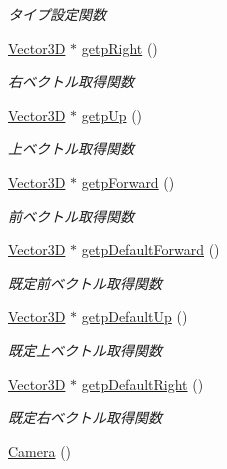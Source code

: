 \begin{DoxyCompactItemize}
\begin{DoxyCompactList}\small\item\em タイプ設定関数 \end{DoxyCompactList}\item 
\mbox{\hyperlink{class_vector3_d}{Vector3D}} $\ast$ \mbox{\hyperlink{class_camera_a4598846e26db6cf3fe4a661b8e6a1917}{getp\+Right}} ()
\begin{DoxyCompactList}\small\item\em 右ベクトル取得関数 \end{DoxyCompactList}\item 
\mbox{\hyperlink{class_vector3_d}{Vector3D}} $\ast$ \mbox{\hyperlink{class_camera_a519361bbdc75f342e7f7754dac1f4e49}{getp\+Up}} ()
\begin{DoxyCompactList}\small\item\em 上ベクトル取得関数 \end{DoxyCompactList}\item 
\mbox{\hyperlink{class_vector3_d}{Vector3D}} $\ast$ \mbox{\hyperlink{class_camera_acef9b42caead07f003dc3f98c0ccdc3c}{getp\+Forward}} ()
\begin{DoxyCompactList}\small\item\em 前ベクトル取得関数 \end{DoxyCompactList}\item 
\mbox{\hyperlink{class_vector3_d}{Vector3D}} $\ast$ \mbox{\hyperlink{class_camera_a6f4c660007278a3db020a72242c9cb26}{getp\+Default\+Forward}} ()
\begin{DoxyCompactList}\small\item\em 既定前ベクトル取得関数 \end{DoxyCompactList}\item 
\mbox{\hyperlink{class_vector3_d}{Vector3D}} $\ast$ \mbox{\hyperlink{class_camera_a1a807dd20a5e8a5d8e5116748a54dfa7}{getp\+Default\+Up}} ()
\begin{DoxyCompactList}\small\item\em 既定上ベクトル取得関数 \end{DoxyCompactList}\item 
\mbox{\hyperlink{class_vector3_d}{Vector3D}} $\ast$ \mbox{\hyperlink{class_camera_ad83e4c1317708ca7282556d3f6a9ad25}{getp\+Default\+Right}} ()
\begin{DoxyCompactList}\small\item\em 既定右ベクトル取得関数 \end{DoxyCompactList}\item 
\mbox{\hyperlink{class_camera_a01f94c3543f56ede7af49dc778f19331}{Camera}} ()

\end{DoxyCompactItemize}
